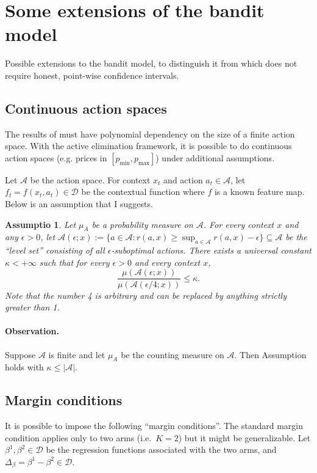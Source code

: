 \documentclass[11pt,a4paper]{article}
\theoremstyle{definition}
\theoremstyle{plain}
\newtheorem{assumption}{Assumptio}[section]
\theoremstyle{remark}
\newcommand{\mD}{\mathcal D}
\newcommand{\mA}{\mathcal A}
\begin{document}
\section{Some extensions of the bandit model}

Possible extensions to the bandit model, to distinguish it from \cite{simchi2022bypassing} which does not require honest, point-wise confidence intervals.

\subsection{Continuous action spaces} The results of \cite{simchi2022bypassing} must have polynomial dependency on the size of a finite action space.
With the active elimination framework, it is possible to do continuous action spaces (e.g. prices in $[p_{\min},p_{\max}]$) under additional assumptions.

Let $\mA$ be the action space. For context $x_t$ and action $a_t\in\mA$, let $f_t = f(x_t,a_t)\in\mD$ be the contextual function where $f$ is a known feature map.
Below is an assumption that I suggests.
\begin{assumption}
Let $\mu_A$ be a probability measure on $\mA$. For every context $x$ and any $\epsilon>0$, let $\mA(\epsilon;x) := \{a\in\mA: r(a,x)\geq \sup_{a\in\mA} r(a,x)-\epsilon\}\subseteq\mA$
be the ``level set'' consisting of all $\epsilon$-suboptimal actions. 
There exists a universal constant $\kappa<+\infty$ such that for every $\epsilon>0$ and every context $x$, 
$$
\frac{\mu(\mA(\epsilon;x))}{\mu(\mA(\epsilon/4;x))} \leq \kappa.
$$
Note that the number 4 is arbitrary and can be replaced by anything strictly greater than 1.
\end{assumption}

\paragraph{Observation.} Suppose $\mA$ is finite and let $\mu_A$ be the counting measure on $\mA$. Then Assumption holds with $\kappa\leq |\mA|$.

\subsection{Margin conditions} 

It is possible to impose the following ``margin conditions''. The standard margin condition applies only to two arms (i.e.~$K=2$) but it might be generalizable.
Let $\beta^1,\beta^2\in\mD$ be the regression functions associated with the two arms, and $\Delta_\beta = \beta^1-\beta^2\in\mD$.
\end{document}
